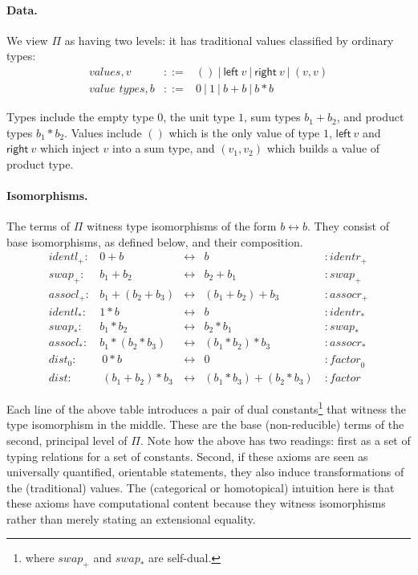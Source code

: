 \documentclass[11pt]{article}
\newcommand{\alt}{~|~}
\newcommand{\leftv}[1]{\textsf{left}~#1}
\newcommand{\rightv}[1]{\textsf{right}~#1}
\newcommand{\iso}{\leftrightarrow}
\newcommand{\identlp}{\mathit{identl}_+}
\newcommand{\identrp}{\mathit{identr}_+}
\newcommand{\swapp}{\mathit{swap}_+}
\newcommand{\assoclp}{\mathit{assocl}_+}
\newcommand{\assocrp}{\mathit{assocr}_+}
\newcommand{\identlt}{\mathit{identl}_*}
\newcommand{\identrt}{\mathit{identr}_*}
\newcommand{\swapt}{\mathit{swap}_*}
\newcommand{\assoclt}{\mathit{assocl}_*}
\newcommand{\assocrt}{\mathit{assocr}_*}
\newcommand{\distz}{\mathit{dist}_0}
\newcommand{\factorz}{\mathit{factor}_0}
\newcommand{\dist}{\mathit{dist}}
\newcommand{\factor}{\mathit{factor}}
\begin{document}
\paragraph*{Data.}
We view $\Pi$ as having two levels: it has traditional values classified by
ordinary types:
\[\begin{array}{rcl} 
\textit{values}, v &::=& () \alt \leftv{v} \alt \rightv{v} \alt (v,v) \\
\textit{value types}, b &::=& 0 \alt 1 \alt b+b \alt b * b
\end{array}\]

Types include the empty type $0$, the unit type $1$, sum types $b_1+b_2$, and
product types $b_1*b_2$.  Values include $()$ which is the only value of type
$1$, $\leftv{v}$ and $\rightv{v}$ which inject $v$ into a sum type, and
$(v_1,v_2)$ which builds a value of product type.

\paragraph*{Isomorphisms.} The terms of $\Pi$ witness
type isomorphisms of the form $b \iso b$. They consist of base isomorphisms,
as defined below, and their composition.
\[\begin{array}{rrcll}
\identlp :&  0 + b & \iso & b &: \identrp \\
\swapp :&  b_1 + b_2 & \iso & b_2 + b_1 &: \swapp \\
\assoclp :&  b_1 + (b_2 + b_3) & \iso & (b_1 + b_2) + b_3 &: \assocrp \\
\identlt :&  1 * b & \iso & b &: \identrt \\
\swapt :&  b_1 * b_2 & \iso & b_2 * b_1 &: \swapt \\
\assoclt :&  b_1 * (b_2 * b_3) & \iso & (b_1 * b_2) * b_3 &: \assocrt \\
\distz :&~ 0 * b & \iso & 0 &: \factorz \\
\dist :&~ (b_1 + b_2) * b_3 & \iso & (b_1 * b_3) + (b_2 * b_3)~ &: \factor
\end{array}\]

Each line of the above table introduces a pair of dual
constants\footnote{where $\swapp$ and $\swapt$ are self-dual.} that witness
the type isomorphism in the middle.  These are the base (non-reducible) terms
of the second, principal level of $\Pi$. Note how the above has two readings:
first as a set of typing relations for a set of constants. Second, if these
axioms are seen as universally quantified, orientable statements, they also
induce transformations of the (traditional) values. The (categorical or
homotopical) intuition here is that these axioms have computational content
because they witness isomorphisms rather than merely stating an extensional
equality.
\end{document}
